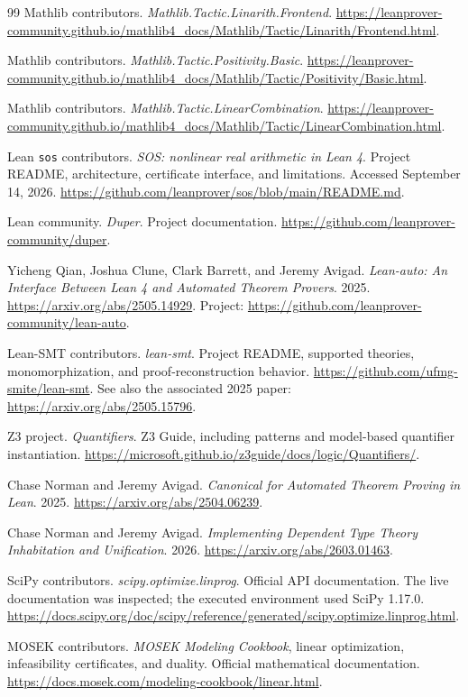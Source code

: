 \begin{thebibliography}{99}
Mathlib contributors. \emph{Mathlib.Tactic.Linarith.Frontend}.
\url{https://leanprover-community.github.io/mathlib4_docs/Mathlib/Tactic/Linarith/Frontend.html}.

Mathlib contributors. \emph{Mathlib.Tactic.Positivity.Basic}.
\url{https://leanprover-community.github.io/mathlib4_docs/Mathlib/Tactic/Positivity/Basic.html}.

Mathlib contributors. \emph{Mathlib.Tactic.LinearCombination}.
\url{https://leanprover-community.github.io/mathlib4_docs/Mathlib/Tactic/LinearCombination.html}.

Lean \texttt{sos} contributors. \emph{SOS: nonlinear real arithmetic in Lean 4}.
Project README, architecture, certificate interface, and limitations.
Accessed September 14, 2026.
\url{https://github.com/leanprover/sos/blob/main/README.md}.

Lean community. \emph{Duper}. Project documentation.
\url{https://github.com/leanprover-community/duper}.

Yicheng Qian, Joshua Clune, Clark Barrett, and Jeremy Avigad.
\emph{Lean-auto: An Interface Between Lean 4 and Automated Theorem Provers}.
2025. \url{https://arxiv.org/abs/2505.14929}.
Project: \url{https://github.com/leanprover-community/lean-auto}.

Lean-SMT contributors. \emph{lean-smt}. Project README, supported theories,
monomorphization, and proof-reconstruction behavior.
\url{https://github.com/ufmg-smite/lean-smt}.
See also the associated 2025 paper:
\url{https://arxiv.org/abs/2505.15796}.

Z3 project. \emph{Quantifiers}. Z3 Guide, including patterns and model-based
quantifier instantiation.
\url{https://microsoft.github.io/z3guide/docs/logic/Quantifiers/}.

Chase Norman and Jeremy Avigad.
\emph{Canonical for Automated Theorem Proving in Lean}. 2025.
\url{https://arxiv.org/abs/2504.06239}.

Chase Norman and Jeremy Avigad.
\emph{Implementing Dependent Type Theory Inhabitation and Unification}. 2026.
\url{https://arxiv.org/abs/2603.01463}.

SciPy contributors. \emph{scipy.optimize.linprog}. Official API documentation.
The live documentation was inspected; the executed environment used SciPy 1.17.0.
\url{https://docs.scipy.org/doc/scipy/reference/generated/scipy.optimize.linprog.html}.

MOSEK contributors. \emph{MOSEK Modeling Cookbook}, linear optimization,
infeasibility certificates, and duality. Official mathematical documentation.
\url{https://docs.mosek.com/modeling-cookbook/linear.html}.

\end{thebibliography}
